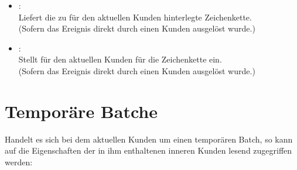 \begin{itemize}
\item
{}:\\
Liefert die zu  für den aktuellen Kunden hinterlegte Zeichenkette.\\
(Sofern das Ereignis direkt durch einen Kunden ausgelöst wurde.)
  
\item
{}:\\
Stellt für den aktuellen Kunden für  die Zeichenkette  ein.\\
(Sofern das Ereignis direkt durch einen Kunden ausgelöst wurde.)

\end{itemize}

\section{Temporäre Batche}

Handelt es sich bei dem aktuellen Kunden um einen temporären Batch, so kann auf die
Eigenschaften der in ihm enthaltenen inneren Kunden lesend zugegriffen werden:

